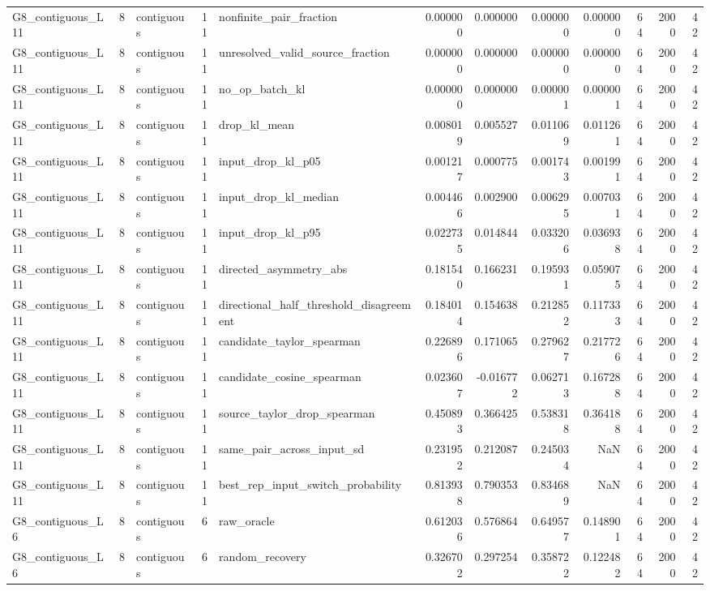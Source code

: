 \begin{tabular}{lrlrlrrrrrrr}
G8_contiguous_L11 & 8 & contiguous & 11 & nonfinite_pair_fraction & 0.000000 & 0.000000 & 0.000000 & 0.000000 & 64 & 2000 & 42 \\
G8_contiguous_L11 & 8 & contiguous & 11 & unresolved_valid_source_fraction & 0.000000 & 0.000000 & 0.000000 & 0.000000 & 64 & 2000 & 42 \\
G8_contiguous_L11 & 8 & contiguous & 11 & no_op_batch_kl & 0.000000 & 0.000000 & 0.000001 & 0.000001 & 64 & 2000 & 42 \\
G8_contiguous_L11 & 8 & contiguous & 11 & drop_kl_mean & 0.008019 & 0.005527 & 0.011069 & 0.011261 & 64 & 2000 & 42 \\
G8_contiguous_L11 & 8 & contiguous & 11 & input_drop_kl_p05 & 0.001217 & 0.000775 & 0.001743 & 0.001991 & 64 & 2000 & 42 \\
G8_contiguous_L11 & 8 & contiguous & 11 & input_drop_kl_median & 0.004466 & 0.002900 & 0.006295 & 0.007031 & 64 & 2000 & 42 \\
G8_contiguous_L11 & 8 & contiguous & 11 & input_drop_kl_p95 & 0.022735 & 0.014844 & 0.033206 & 0.036938 & 64 & 2000 & 42 \\
G8_contiguous_L11 & 8 & contiguous & 11 & directed_asymmetry_abs & 0.181540 & 0.166231 & 0.195931 & 0.059075 & 64 & 2000 & 42 \\
G8_contiguous_L11 & 8 & contiguous & 11 & directional_half_threshold_disagreement & 0.184014 & 0.154638 & 0.212852 & 0.117333 & 64 & 2000 & 42 \\
G8_contiguous_L11 & 8 & contiguous & 11 & candidate_taylor_spearman & 0.226896 & 0.171065 & 0.279627 & 0.217726 & 64 & 2000 & 42 \\
G8_contiguous_L11 & 8 & contiguous & 11 & candidate_cosine_spearman & 0.023607 & -0.016772 & 0.062713 & 0.167288 & 64 & 2000 & 42 \\
G8_contiguous_L11 & 8 & contiguous & 11 & source_taylor_drop_spearman & 0.450893 & 0.366425 & 0.538318 & 0.364188 & 64 & 2000 & 42 \\
G8_contiguous_L11 & 8 & contiguous & 11 & same_pair_across_input_sd & 0.231952 & 0.212087 & 0.245034 & NaN & 64 & 2000 & 42 \\
G8_contiguous_L11 & 8 & contiguous & 11 & best_rep_input_switch_probability & 0.813938 & 0.790353 & 0.834689 & NaN & 64 & 2000 & 42 \\
G8_contiguous_L6 & 8 & contiguous & 6 & raw_oracle & 0.612036 & 0.576864 & 0.649577 & 0.148901 & 64 & 2000 & 42 \\
G8_contiguous_L6 & 8 & contiguous & 6 & random_recovery & 0.326702 & 0.297254 & 0.358722 & 0.122482 & 64 & 2000 & 42 \\

\end{tabular}
